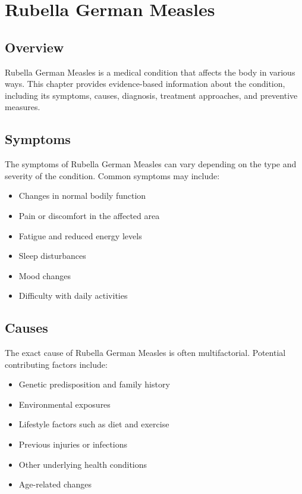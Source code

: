 \chapter{Rubella German Measles}

\section*{Overview}
Rubella German Measles is a medical condition that affects the body in various ways. This chapter provides evidence-based information about the condition, including its symptoms, causes, diagnosis, treatment approaches, and preventive measures.

\section*{Symptoms}
The symptoms of Rubella German Measles can vary depending on the type and severity of the condition. Common symptoms may include:

\begin{itemize}
\item Changes in normal bodily function
\item Pain or discomfort in the affected area
\item Fatigue and reduced energy levels
\item Sleep disturbances
\item Mood changes
\item Difficulty with daily activities
\end{itemize}

\section*{Causes}
The exact cause of Rubella German Measles is often multifactorial. Potential contributing factors include:

\begin{itemize}
\item Genetic predisposition and family history
\item Environmental exposures
\item Lifestyle factors such as diet and exercise
\item Previous injuries or infections
\item Other underlying health conditions
\item Age-related changes
\end{itemize}


